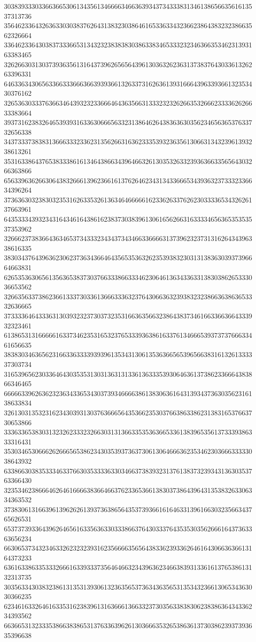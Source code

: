 30383933303366366530613435613466663466363934373433383134613865663561613537313736
35646233643263633030383762643138323038646165336334323662386438323238663562326664
33646233643038373336653134323238383830386338346533323234636635346231393163383465
32626630313037393635613164373962656564396130363262363137383764303361326263396331
64633634306563366333666366393936613263373162636139316664396339366132353430376162
32653630333763663464393232336664643635663133323232626635326662333362626633383664
39373162383264653939316336306665633231386462643836363035623465636537633732656338
34373337383831366633323362313562663163623335393236356130663134323961393238613261
35316338643765383338616134643866343964663261303532633239363663356564303266363866
65633963626630643832666139623661613762646234313433666534393632373332336634396264
37363630323830323531626335326136346466666162336263376262303333653432626137663961
64353334393234316434616438616238373038396130616562663163333465636535353537353962
32666237383664363465373433323434373434663366663137396232373131626434396338616335
38303437643963623062373634366464356535363262353938323031313836303937396664663831
62653536306561356365383730376633386633346230646136343363313830386265333036653562
32663563373862366133373033613666333632376430663632393832323866363863653332636665
37333364643336313039323237303732353166363566323864383734616633663664333932323461
61386531316666616337346235316532376533393638616337613466653937373766633461656635
38383034636562316633633339393961353431306135363665653965663831613261333337303734
31653965623033646430353531303136313133613633353930646361373862336664383866346465
66666339626362323634336534303739346666386138306361643139343736303562316138633834
32613031353231623430393130376366656435366235303766386338623138316537663730653866
33363365383031323262333232663031313663353536366533613839653561373339386333316431
35303465306662626665653862343035393736373061306466636235346230366633333038643932
63386630383533346337663035333363303466373839323137613837323934313630353763366430
32353462386664626461666638366466376233653661383037386439643135383263306334363532
37383061316639613962626139373638656435373936616164633139616630323566343765626531
65373739336439626465616335636330333866376430333764353530356266616437363363656234
66306537343234633262323239316235666635656438336239336264616430663636613164373233
63616338633533326661633933373564646632343963623466383931336161376538613132313735
30356334303832386131353139306132363565373634363565313534323661306534363030366235
62346163326461633531623839613163666136633237303563383830623838636434336234393562
66366531323335386638386531376336396261303666353265386361373038623937393635396638
